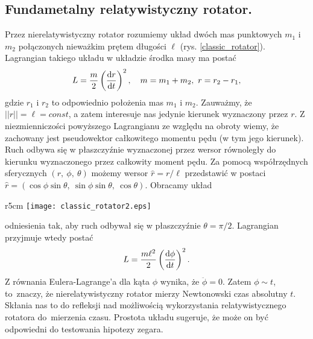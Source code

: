 \subsection{Fundametalny relatywistyczny rotator.}
Przez nierelatywistyczny rotator rozumiemy układ dwóch mas punktowych
$m_1$ i $m_2$ połączonych nieważkim
prętem długości $\ell$ (rys. \ref{classic_rotator}). Lagrangian 
takiego układu w układzie środka masy ma postać~\cite{landau1978krotki}
\begin{align*}
L = \frac{m }{2} \left(\frac{\text{d} r}{\text{d} t}\right)^2, 
\quad m=m_1+m_2,\ r=r_2-r_1,
\end{align*}
gdzie $r_1$ i $r_2$ to odpowiednio położenia mas $m_1$ i $m_2$.
Zauważmy, że $||r|| =\ell = const$, a zatem interesuje nas jedynie kierunek 
wyznaczony przez $r$.
Z niezmienniczości powyższego Lagrangianu ze względu na obroty wiemy, że
 zachowany jest pseudowektor całkowitego
momentu pędu (w tym jego kierunek). Ruch
odbywa się w płaszczyźnie wyznaczonej przez 
wersor równoległy do kierunku wyznaczonego 
przez całkowity moment pędu.
 Za pomocą  współrzędnych sferycznych $(r,\ \phi,\ \theta)$ 
możemy wersor $ \hat{r} = r / \ell$  przedstawić w postaci
 $\hat{r} = ( \cos \phi \sin\theta, \ \sin\phi\sin\theta,\ \cos\theta )$.
Obracamy układ 
\begin{wrapfigure}[8]{r}{5cm}
\centering
\texttt{[image: classic\_rotator2.eps]}
\caption{Klasyczny rotator.
}
\label{classic_rotator}
\end{wrapfigure}
odniesienia tak, aby ruch odbywał się w
 płaszczyźnie $\theta = \pi/2$. 
Lagrangian 
przyjmuje wtedy postać
\begin{align*}
L = \frac{m\ell^2 }{2} \left(\frac{\text{d} \phi}{\text{d} t}\right)^2.
\end{align*}
Z równania Eulera-Lagrange'a dla kąta $\phi$ wynika, że 
$\ddot{\phi} = 0.$
Zatem $\phi \sim t$, to~znaczy, że
nierelatywistyczny rotator mierzy Newtonowski czas
absolutny $t$. Skłania nas to do refleksji nad możliwością 
wykorzystania relatywistycznego rotatora 
do~mierzenia czasu. Prostota układu sugeruje, że 
może on być odpowiedni do testowania hipotezy zegara.


